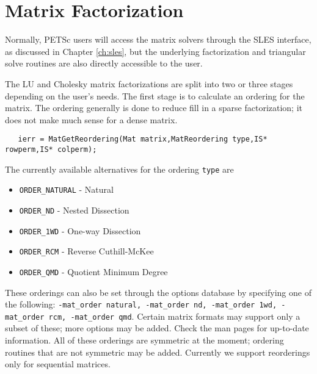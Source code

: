 \section{Matrix Factorization} 
\label{sec:matfactor}

Normally, PETSc users will access the matrix solvers through the 
SLES interface, as discussed in Chapter \ref{ch:sles}, but the underlying 
factorization and triangular solve routines are also directly 
accessible to the user.

\medskip \medskip

The LU and Cholesky 
matrix factorizations are split into 
two or three stages depending on the user's needs. The first stage is 
to calculate an ordering for the matrix.  The ordering generally is 
done to reduce fill in a sparse factorization; it does not make much 
sense for a dense matrix.  
\begin{verbatim}
   ierr = MatGetReordering(Mat matrix,MatReordering type,IS* rowperm,IS* colperm); 
\end{verbatim}
The currently available alternatives for the ordering {\tt type} are 
\begin{itemize}
\item {\tt ORDER\_NATURAL} - Natural
\item {\tt ORDER\_ND} - Nested Dissection
\item {\tt ORDER\_1WD} - One-way Dissection
\item {\tt ORDER\_RCM} - Reverse Cuthill-McKee
\item {\tt ORDER\_QMD} - Quotient Minimum Degree
\end{itemize}
These orderings can also be set through the options database by specifying 
one of the following:  {\tt -mat\_order natural, -mat\_order nd, 
-mat\_order 1wd, -mat\_order rcm, -mat\_order qmd}.
  
  
  
 
Certain matrix formats may support only a subset of these; more options may 
be added. Check the man pages for up-to-date information. All of these orderings are 
symmetric at the moment; ordering routines that are 
not symmetric may be added. Currently we support reorderings only for 
sequential matrices.

